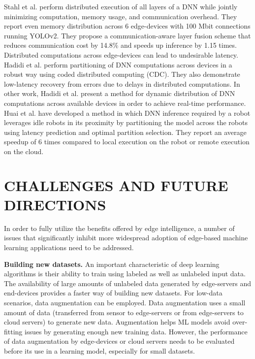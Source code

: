 \documentclass[letterpaper, 10 pt, conference]{ieeeconf}
\begin{document}
Stahl et al. perform distributed execution of all layers of a DNN while jointly minimizing computation, memory usage, and communication overhead\cite{Stahl_Zhao_Mueller-Gritschneder_Gerstlauer_Schlichtmann_2019}. They report even memory distribution across 6 edge-devices with 100 Mbit connections running YOLOv2. They propose a communication-aware layer fusion scheme that reduces communication cost by 14.8\% and speeds up inference by 1.15 times. Distributed computations across edge-devices can lead to undesirable latency. Hadidi et al. perform partitioning of DNN computations across devices in a robust way using coded distributed computing (CDC)\cite{Hadidi_Cao_Ryoo_Kim_2019}. They also demonstrate low-latency recovery from errors due to delays in distributed computations. In other work, Hadidi et al. present a method for dynamic distribution of DNN computations across available devices in order to achieve real-time performance\cite{Hadidi_8411096}. Huai et al. have developed a method in which DNN inference required by a robot leverages idle robots in its proximity by partitioning the model across the robots using latency prediction and optimal partition selection\cite{Huai_Ding_Wang_Geng_Zhang_2019}. They report an average speedup of 6 times compared to local execution on the robot or remote execution on the cloud.

\section{CHALLENGES AND FUTURE DIRECTIONS}
In order to fully utilize the benefits offered by edge intelligence, a number of issues that significantly inhibit more widespread adoption of edge-based machine learning applications need to be addressed.

\textbf{Building new datasets.} An important characteristic of deep learning algorithms is their ability to train using labeled as well as unlabeled input data. The availability of large amounts of unlabeled data generated by edge-servers and end-devices provides a faster way of building new datasets. For low-data scenarios, data augmentation can be employed\cite{Nweke_Teh_Al-garadi_Alo_2018}. Data augmentation uses a small amount of data (transferred from sensor to edge-servers or from edge-servers to cloud servers) to generate new data. Augmentation helps ML models avoid over-fitting issues by generating enough new training data\cite{Nweke_Teh_Al-garadi_Alo_2018}. However, the performance of data augmentation by edge-devices or cloud servers needs to be evaluated before its use in a learning model, especially for small datasets.
\end{document}
